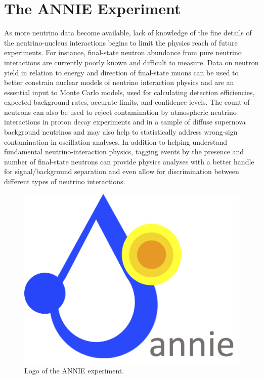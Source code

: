 
\chapter{The ANNIE Experiment}
\label{cha:2}

 As more neutrino data become available, lack of knowledge of the fine details of the %
 neutrino-nucleus interactions begins to limit the physics reach of future experiments. 
 For instance, final-state neutron abundance from pure neutrino interactions are currently %
 poorly known and difficult to measure.
 Data on neutron yield in relation to energy and direction of final-state muons can be used to %
 better constrain nuclear models of neutrino interaction %
 physics and are an essential input to Monte Carlo models, used for calculating %
 detection efficiencies, expected background rates, accurate limits, and confidence levels.
 The count of neutrons can also be used to reject contamination by atmospheric %
 neutrino interactions in proton decay experiments and in a sample of diffuse supernova %
 background neutrinos and may also help to statistically address wrong-sign contamination %
 in oscillation analyses.
 In addition to helping understand fundamental neutrino-interaction physics, tagging events %
 by the presence and number of final-state neutrons can provide physics analyses with a better %
 handle for signal/background separation and even allow for discrimination between %
 different types of neutrino interactions.

 \begin{figure}
   \centering
   \includegraphics[scale=.2]{pics/logo_2}
   \caption{Logo of the ANNIE experiment.}
   \label{fig:logo}
 \end{figure}

